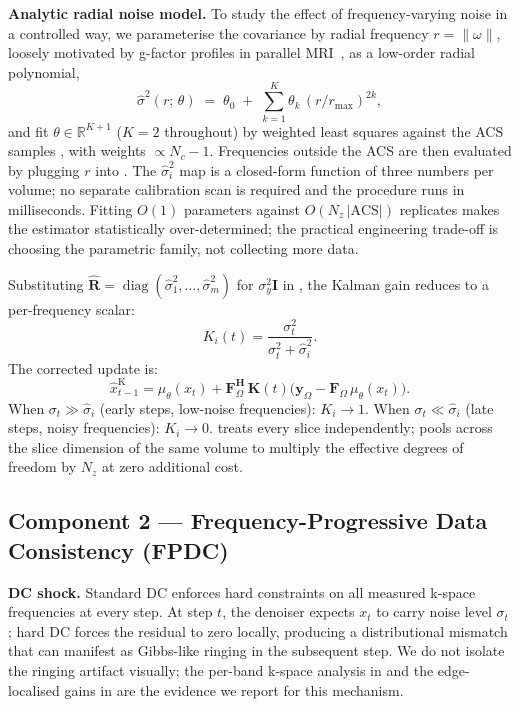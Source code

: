 \documentclass[10pt,twocolumn,letterpaper]{article}
\newcommand{\hatR}{\hat{\mathbf{R}}}
\newcommand{\hatsig}{\hat{\sigma}}
\newcommand{\muth}{\mu_\theta}
\begin{document}
\textbf{Analytic radial noise model.} To study the effect of frequency-varying
noise in a controlled way, we parameterise the covariance by radial frequency
$r=\|\omega\|$, loosely motivated by g-factor profiles in parallel
MRI~\cite{uecker2014espirit},
as a low-order radial polynomial,
\begin{equation}
  \hatsig^2(r;\,\theta) \;=\; \theta_0 \;+\; \sum_{k=1}^{K}
  \theta_k\,(r/r_{\max})^{2k},
  \label{eq:radial_model}
\end{equation}
and fit $\theta\!\in\!\mathbb{R}^{K+1}$ ($K{=}2$ throughout) by weighted
least squares against the ACS samples , with weights
$\propto N_c{-}1$. Frequencies outside the ACS are then evaluated by
plugging $r$ into . The $\hat\sigma_i^2$ map
is a closed-form function of three numbers per volume; no separate
calibration scan is required and the procedure runs in milliseconds.
Fitting $O(1)$ parameters against $O(N_z\,|\text{ACS}|)$ replicates makes
the estimator statistically over-determined; the practical engineering
trade-off is choosing the parametric family, not collecting more data.

Substituting $\hatR=\operatorname{diag}(\hatsig_1^2,\ldots,\hatsig_m^2)$
for $\sigma_y^2\mathbf{I}$ in , the Kalman gain reduces to
a per-frequency scalar:
\begin{equation}
  K_i(t) = \frac{\sigma_t^2}{\sigma_t^2 + \hatsig_i^2}.
  \label{eq:gain}
\end{equation}
The corrected update is:
\begin{equation}
  \hat{x}_{t-1}^{\text{K}} = \muth(x_t)
  + \mathbf{F}_\Omega^\mathbf{H}\, \mathbf{K}(t)
  \bigl(\mathbf{y}_\Omega - \mathbf{F}_\Omega\,\muth(x_t)\bigr).
  \label{eq:kalman_update}
\end{equation}
When $\sigma_t \gg \hatsig_i$ (early steps, low-noise frequencies): $K_i
\rightarrow 1$. When $\sigma_t \ll \hatsig_i$ (late steps, noisy
frequencies): $K_i \rightarrow 0$.  treats
every slice independently;  pools across the slice dimension
of the same volume to multiply the effective degrees of freedom by $N_z$ at
zero additional cost.

\subsection{Component 2 — Frequency-Progressive Data Consistency (FPDC)}

\textbf{DC shock.} Standard DC enforces hard constraints on all measured
k-space frequencies at every step. At step $t$, the denoiser expects
$x_t$ to carry noise level $\sigma_t$; hard DC forces the residual to
zero locally, producing a distributional mismatch that can manifest as
Gibbs-like ringing in the subsequent step. We do not isolate the ringing
artifact visually; the per-band k-space analysis in  and the
edge-localised gains in  are the evidence we report for this
mechanism.
\end{document}
